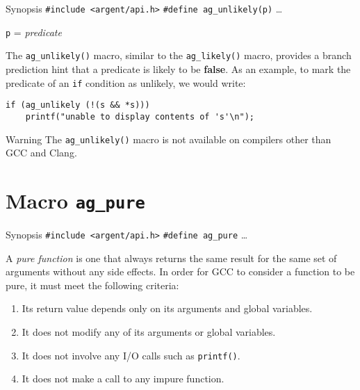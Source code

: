 \begin{bclogo}[logo=\bccrayon, noborder=true, barre=snake, couleurBarre=gray]
    {Synopsis}
  \verb|#include <argent/api.h>|
  \verb|#define ag_unlikely(p)| \ldots
  \par
  \texttt{p} = \emph{predicate}
\end{bclogo}

The \verb|ag_unlikely()| macro, similar to the \verb|ag_likely()| macro,
provides a branch prediction hint that a predicate is likely to be 
\textbf{false}. As an example, to mark the predicate of an \verb|if| condition 
as unlikely, we would write:

\begin{lstlisting}[linewidth=1.0\linewidth]
if (ag_unlikely (!(s && *s))) 
    printf("unable to display contents of 's'\n");
\end{lstlisting}

\begin{bclogo}[logo=\bctakecare, noborder=true, couleurBarre=orange]{Warning}
  The \verb|ag_unlikely()| macro is not available on compilers other than GCC 
  and Clang.
\end{bclogo}




\section{Macro \texttt{ag\_pure}}

\begin{bclogo}[logo=\bccrayon, noborder=true, barre=snake, couleurBarre=gray]
    {Synopsis}
  \verb|#include <argent/api.h>|
  \verb|#define ag_pure| \ldots
\end{bclogo}

A \emph{pure function} is one that always returns the same result for the same
set of arguments without any side effects. In order for GCC to consider a
function to be pure, it must meet the following criteria:
\begin{enumerate}
  \item Its return value depends only on its arguments and global variables.
  \item It does not modify any of its arguments or global variables.
  \item It does not involve any I/O calls such as \texttt{printf()}.
  \item It does not make a call to any impure function.
\end{enumerate}

